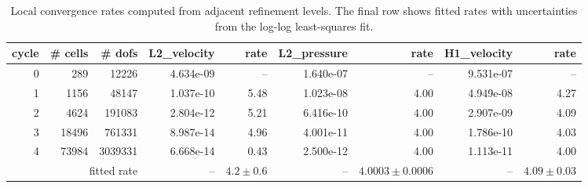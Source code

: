 \begin{table}[htbp]
\centering
\begin{tabular}{|r|r|r|r|r|r|r|r|r|}
\hline
cycle & \# cells & \# dofs & L2\_velocity & rate & L2\_pressure & rate & H1\_velocity & rate \\ \hline
0 & 289 & 12226 & 4.634e-09 & -- & 1.640e-07 & -- & 9.531e-07 & -- \\ \hline
1 & 1156 & 48147 & 1.037e-10 & 5.48 & 1.023e-08 & 4.00 & 4.949e-08 & 4.27 \\ \hline
2 & 4624 & 191083 & 2.804e-12 & 5.21 & 6.416e-10 & 4.00 & 2.907e-09 & 4.09 \\ \hline
3 & 18496 & 761331 & 8.987e-14 & 4.96 & 4.001e-11 & 4.00 & 1.786e-10 & 4.03 \\ \hline
4 & 73984 & 3039331 & 6.668e-14 & 0.43 & 2.500e-12 & 4.00 & 1.113e-11 & 4.00 \\ \hline
\multicolumn{3}{|r|}{fitted rate} & -- & $4.2 \pm 0.6$ & -- & $4.0003 \pm 0.0006$ & -- & $4.09 \pm 0.03$ \\ \hline
\end{tabular}
\caption{Local convergence rates computed from adjacent refinement levels. The final row shows fitted rates with uncertainties from the log-log least-squares fit.}
\end{table}
